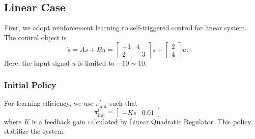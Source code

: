 \documentclass[english, dvipdfmx]{ampmt}             %
\begin{document}
\subsection{Linear Case}
First, we adopt reinforcement learning to self-triggered control for linear system. The control object is
\begin{equation}
	\dot{s} = As + Bu = \begin{bmatrix}-1& 4 \\ 2 & -3\end{bmatrix}s + \begin{bmatrix}2 \\ 4\end{bmatrix}u.
\end{equation}
Here, the input signal $u$ is limited to $-10 \sim 10$.

\subsubsection{Initial Policy}
For learning efficiency, we use $\pi^l_{\textrm{init}}$ such that
\begin{equation}
	\pi^l_{\textrm{init}} = \begin{bmatrix}-Ks&0.01\end{bmatrix}
\end{equation}
where $K$ is a feedback gain calculated by Linear Quadratic Regulator. This policy stabilize the system.
\end{document}
